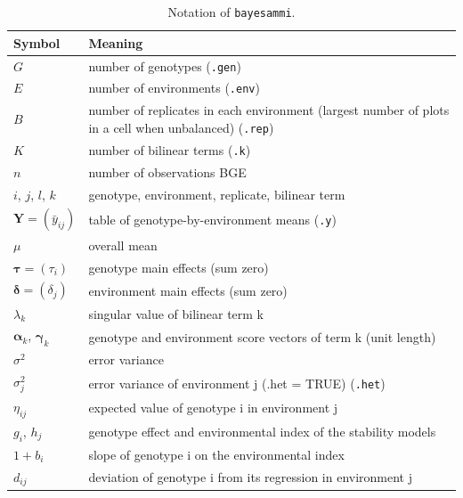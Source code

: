 \begin{longtable}{>{\raggedright\arraybackslash}p{}>{\raggedright\arraybackslash}p{}}
\caption{Notation of \texttt{bayesammi}.}\\
\toprule
Symbol & Meaning\\
\midrule
\endhead
$G$ & number of genotypes (\texttt{.gen})\\
$E$ & number of environments (\texttt{.env})\\
$B$ & number of replicates in each environment (largest number of plots in a cell when unbalanced) (\texttt{.rep})\\
$K$ & number of bilinear terms (\texttt{.k})\\
$n$ & number of observations BGE\\
$i$, $j$, $l$, $k$ & genotype, environment, replicate, bilinear term\\
$\mathbf{Y} = (\bar{y}_{ij})$ & table of genotype-by-environment means (\texttt{.y})\\
$\mu$ & overall mean\\
$\boldsymbol{\tau} = (\tau_i)$ & genotype main effects (sum zero)\\
$\boldsymbol{\delta} = (\delta_j)$ & environment main effects (sum zero)\\
$\lambda_k$ & singular value of bilinear term k\\
$\boldsymbol{\alpha}_k$, $\boldsymbol{\gamma}_k$ & genotype and environment score vectors of term k (unit length)\\
$\sigma^2$ & error variance\\
$\sigma^2_j$ & error variance of environment j (.het = TRUE) (\texttt{.het})\\
$\eta_{ij}$ & expected value of genotype i in environment j\\
$g_i$, $h_j$ & genotype effect and environmental index of the stability models\\
$1 + b_i$ & slope of genotype i on the environmental index\\
$d_{ij}$ & deviation of genotype i from its regression in environment j\\

\end{longtable}
